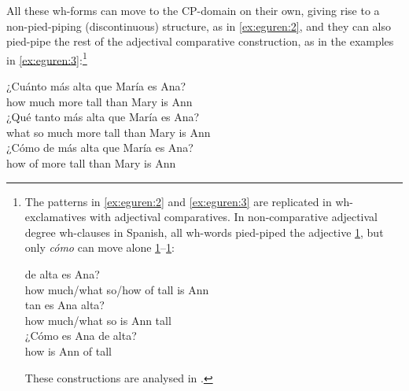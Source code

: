 \documentclass[output=paper,colorlinks,citecolor=brown]{langscibook}
\begin{document}
All these wh-forms can move to the CP-domain on their own, giving rise to a non-pied-piping (discontinuous) structure, as in \ref{ex:eguren:2}, and they can also pied-pipe the rest of the adjectival comparative construction, as in the examples in \ref{ex:eguren:3}:\footnote{The patterns in \ref{ex:eguren:2} and \ref{ex:eguren:3} are replicated in wh-exclamatives with adjectival comparatives. In non-comparative adjectival degree wh-clauses in Spanish, all wh-words pied-piped the adjective \ref{ex:eguren:fn1a}, but only \textit{cómo} can move alone \ref{ex:eguren:fn1b}--\ref{ex:eguren:fn1c}:
 \begin{exe}
      \ex\label{ex:eguren:fn1}
       \begin{xlist} %
        \ex \label{ex:eguren:fn1a}
             de	alta	es	Ana?\\   %
            {how much/what so/how} of tall is	Ann\\
            \ex\label{ex:eguren:fn1b}
             tan es	Ana	alta?\\
            {} {how much/what} so is	Ann	tall\\
            \ex\label{ex:eguren:fn1c}
            \gll ¿Cómo	es	Ana	de	alta?\\
            how	is	Ann	of	tall\\
\end{xlist}
 \end{exe}
These constructions are analysed in \citet{eguren2020pied}.}

\begin{exe} 
    \ex\label{ex:eguren:3} 
    \begin{xlist}
            \ex
            \gll   ¿Cuánto	más	alta	que	María	es	Ana?\\   %
{how much}	more	tall	than	Mary	is	Ann\\    %
            \ex
            \gll ¿Qué	tanto	más	alta	que	María	es	Ana?\\
                what	{so much}	more tall	than	Mary		is	Ann\\
            \ex\label{ex:eguren:3c}
            \gll ¿Cómo	de	más	alta	que	María	es	Ana?\\
              how	of	more	tall	than	Mary		is	Ann\\
    \end{xlist}
\end{exe}
\end{document}
